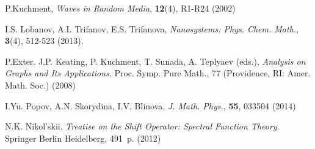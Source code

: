 \documentclass{nsart_eng}
\begin{document}
\begin{thebibliography}{99}
 P.Kuchment, \textit{Waves in Random Media}, \textbf{12}(4), R1-R24 (2002)

 I.S. Lobanov, A.I. Trifanov, E.S. Trifanova, \textit{Nanosystems: Phys. Chem. Math.}, \textbf{3}(4), 512-523 (2013).

 P.Exter. J.P. Keating, P. Kuchment, T. Sunada, A. Teplyaev (eds.), \textit{Analysis on Graphs and Its Applications}. Proc. Symp. Pure Math., 77 (Providence, RI: Amer. Math. Soc.) (2008)

 I.Yu. Popov, A.N. Skorydina, I.V. Blinova, \textit{J. Math. Phys.}, \textbf{55}, 033504 (2014)

 N.K. Nikol'skii. {\it Treatise on the Shift Operator: Spectral Function Theory}.  Springer Berlin Heidelberg,  491~p. (2012)





\end{thebibliography}
\end{document}
